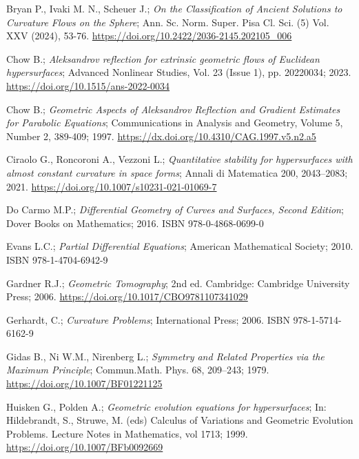 \documentclass[a4paper, 12pt]{book}
\begin{document}
{}
\begin{thebibliography}{18} 
	
	Bryan P., Ivaki M. N., Scheuer J.; {\em On the Classification of Ancient Solutions to Curvature Flows on the Sphere}; Ann. Sc. Norm. Super. Pisa Cl. Sci. (5)
	Vol. XXV (2024), 53-76. \href{https://doi.org/10.2422/2036-2145.202105_006}{https://doi.org/10.2422/2036-2145.202105\_006} 
	
	 Chow B.; {\em Aleksandrov reflection for extrinsic geometric flows of Euclidean hypersurfaces}; Advanced Nonlinear Studies, Vol. 23 (Issue 1), pp. 20220034; 2023. \href{https://doi.org/10.1515/ans-2022-0034}{https://doi.org/10.1515/ans-2022-0034}
	
	 Chow B.; {\em Geometric Aspects of Aleksandrov Reflection and Gradient Estimates for Parabolic Equations}; Communications in Analysis and Geometry, Volume 5, Number 2, 389-409; 1997. \href{https://dx.doi.org/10.4310/CAG.1997.v5.n2.a5}{https://dx.doi.org/10.4310/CAG.1997.v5.n2.a5}
	
	 Ciraolo G., Roncoroni A., Vezzoni L.;  {\em Quantitative stability for hypersurfaces with almost constant curvature in space forms}; Annali di Matematica 200, 2043–2083; 2021. \href{https://doi.org/10.1007/s10231-021-01069-7}{https://doi.org/10.1007/s10231-021-01069-7}
	
	 Do Carmo M.P.; {\em Differential Geometry of Curves and Surfaces, Second Edition};  Dover Books on Mathematics; 2016. ISBN 978-0-4868-0699-0
	
	 Evans L.C.; {\em Partial Differential Equations};  American Mathematical Society; 2010. ISBN 978-1-4704-6942-9
	
	 Gardner R.J.; {\em Geometric Tomography}; 2nd ed. Cambridge: Cambridge University Press; 2006. \href{https://doi.org/10.1017/CBO9781107341029}{https://doi.org/10.1017/CBO9781107341029}
	
	 Gerhardt, C.; {\em Curvature Problems}; International Press; 2006. ISBN 978-1-5714-6162-9
	
	 Gidas B., Ni W.M., Nirenberg L.; {\em Symmetry and Related Properties via the Maximum Principle};  Commun.Math. Phys. 68, 209–243; 1979. \href{ https://doi.org/10.1007/BF01221125}{ https://doi.org/10.1007/BF01221125}
	
	 Huisken G., Polden A.; {\em Geometric evolution equations for hypersurfaces};  In: Hildebrandt, S., Struwe, M. (eds) Calculus of Variations and Geometric Evolution Problems. Lecture Notes in Mathematics, vol 1713; 1999. \href{https://doi.org/10.1007/BFb0092669}{https://doi.org/10.1007/BFb0092669}
	

\end{thebibliography}
\end{document}
